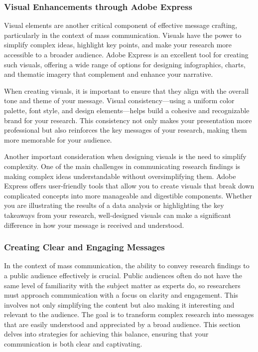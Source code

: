 \documentclass[
]{book}
\begin{document}
\subsubsection*{Visual Enhancements through Adobe Express}\label{visual-enhancements-through-adobe-express}

Visual elements are another critical component of effective message crafting, particularly in the context of mass communication. Visuals have the power to simplify complex ideas, highlight key points, and make your research more accessible to a broader audience. Adobe Express is an excellent tool for creating such visuals, offering a wide range of options for designing infographics, charts, and thematic imagery that complement and enhance your narrative.

When creating visuals, it is important to ensure that they align with the overall tone and theme of your message. Visual consistency---using a uniform color palette, font style, and design elements---helps build a cohesive and recognizable brand for your research. This consistency not only makes your presentation more professional but also reinforces the key messages of your research, making them more memorable for your audience.

Another important consideration when designing visuals is the need to simplify complexity. One of the main challenges in communicating research findings is making complex ideas understandable without oversimplifying them. Adobe Express offers user-friendly tools that allow you to create visuals that break down complicated concepts into more manageable and digestible components. Whether you are illustrating the results of a data analysis or highlighting the key takeaways from your research, well-designed visuals can make a significant difference in how your message is received and understood.

\subsubsection*{Creating Clear and Engaging Messages}\label{creating-clear-and-engaging-messages}

In the context of mass communication, the ability to convey research findings to a public audience effectively is crucial. Public audiences often do not have the same level of familiarity with the subject matter as experts do, so researchers must approach communication with a focus on clarity and engagement. This involves not only simplifying the content but also making it interesting and relevant to the audience. The goal is to transform complex research into messages that are easily understood and appreciated by a broad audience. This section delves into strategies for achieving this balance, ensuring that your communication is both clear and captivating.
\end{document}
